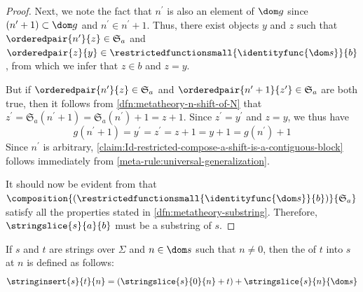 \begin{proof}
    \vspace{0.3cm}
    \noindent
    Next, we note the fact that \( n^{\prime} \) is also an element of \( \dom g \) since \( \mleft( n^{\prime} + 1 \mright) \subset \dom g \) and \( n^{\prime} \in n^{\prime} + 1 \).
    Thus, there exist objects \( y \) and \( z \) such that \( \orderedpair{n^{\prime}}{z} \in \mathfrak{S}_{a} \)
    and \( \orderedpair{z}{y} \in \restrictedfunctionsmall{ \identityfunc{\dom s} }{b} \), from which we
    infer that \( z \in b \) and \( z = y \).

    \vspace{0.3cm}
    \noindent
    But if \( \orderedpair{n^{\prime}}{z} \in \mathfrak{S}_{a} \) and \( \orderedpair{n^{\prime} + 1}{z^{\prime}} \in \mathfrak{S}_{a} \) are both true,
    then it follows from \cref{dfn:metatheory-n-shift-of-N} that
    \( z^{\prime} = \mathfrak{S}_{a}(n^{\prime} + 1) = \mathfrak{S}_{a}(n^{\prime}) + 1 = z + 1 \).
    Since \( z^{\prime} = y^{\prime} \) and \( z = y \), we thus have
    \begin{equation*}
        g(n^{\prime} + 1) = y^{\prime} = z^{\prime} = z + 1 = y + 1 = g(n^{\prime}) + 1
    \end{equation*}
    Since \( n^{\prime} \) is arbitrary, \cref{claim:Id-restricted-compose-a-shift-is-a-contiguous-block} follows immediately from \cref{meta-rule:universal-generalization}.

    \vspace{0.3cm}
    \noindent
    It should now be evident from 
    that \( \composition{\mleft( \restrictedfunctionsmall{ \identityfunc{\dom s} }{b} \mright)}{\mathfrak{S}_{a}} \) satisfy all the properties
    stated in \cref{dfn:metatheory-substring}.
    Therefore, \( \stringslice{s}{a}{b} \) must be a substring of \( s \).
\end{proof}

\begin{dfn}[Insert]
     \label{dfn:metatheory-string-insert}
    If \( s \) and \( t \) are strings over \( \Sigma \) and \( n \in \dom s \) such that \( n \neq 0 \),
    then the  of \( t \) into \( s \) at \( n \) is defined as follows:
    \begin{equation*}
        \stringinsert{s}{t}{n} = \mleft( \stringslice{s}{0}{n} + t \mright) +  \stringslice{s}{n}{\dom s}
    \end{equation*}
\end{dfn}

